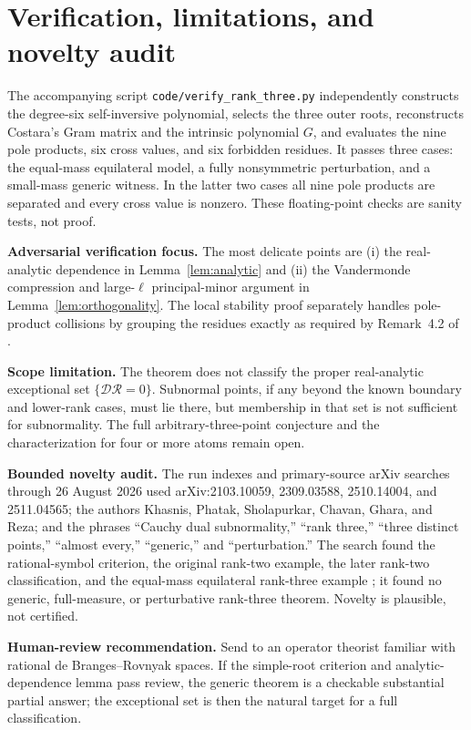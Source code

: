 \documentclass[11pt]{article}
\begin{document}
\section{Verification, limitations, and novelty audit}

The accompanying script \texttt{code/verify\_rank\_three.py} independently
constructs the degree-six self-inversive polynomial, selects the three outer
roots, reconstructs Costara's Gram matrix and the intrinsic polynomial $G$,
and evaluates the nine pole products, six cross values, and six forbidden
residues.  It passes three cases: the equal-mass equilateral model, a fully
nonsymmetric perturbation, and a small-mass generic witness.  In the latter
two cases all nine pole products are separated and every cross value is
nonzero.  These floating-point checks are sanity tests, not proof.

\textbf{Adversarial verification focus.}
The most delicate points are (i) the real-analytic dependence in
Lemma~\ref{lem:analytic} and (ii) the Vandermonde compression and
large-$\ell$ principal-minor argument in Lemma~\ref{lem:orthogonality}.
The local stability proof separately handles pole-product collisions by
grouping the residues exactly as required by Remark~4.2 of \cite{CGR}.

\textbf{Scope limitation.}
The theorem does not classify the proper real-analytic exceptional set
$\{\mathcal D\mathcal R=0\}$.  Subnormal points, if any beyond the known boundary
and lower-rank cases, must lie there, but membership in that set is not
sufficient for subnormality.  The full arbitrary-three-point conjecture and
the characterization for four or more atoms remain open.

\textbf{Bounded novelty audit.}
The run indexes and primary-source arXiv searches through 26 August 2026 used
arXiv:2103.10059, 2309.03588, 2510.14004, and 2511.04565; the authors Khasnis,
Phatak, Sholapurkar, Chavan, Ghara, and Reza; and the phrases ``Cauchy dual
subnormality,'' ``rank three,'' ``three distinct points,'' ``almost every,''
``generic,'' and ``perturbation.''  The search found the rational-symbol
criterion, the original rank-two example, the later rank-two classification,
and the equal-mass equilateral rank-three example \cite{CGR,KS,JPS}; it found
no generic, full-measure, or perturbative rank-three theorem.  Novelty is
plausible, not certified.

\textbf{Human-review recommendation.}
Send to an operator theorist familiar with rational de Branges--Rovnyak
spaces.  If the simple-root criterion and analytic-dependence lemma pass
review, the generic
theorem is a checkable substantial partial answer; the exceptional
set is then the natural target for a full classification.
\end{document}
